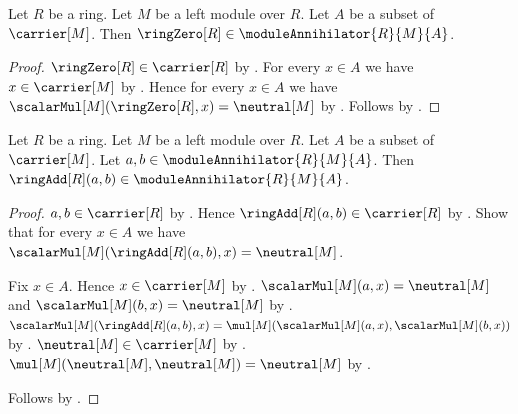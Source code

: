 \begin{proposition}\label{module_annihilator_zero}
    Let $R$ be a ring.
    Let $M$ be a left module over $R$.
    Let $A$ be a subset of $\carrier[M]$.
    Then $\ringZero[R]\in\moduleAnnihilator{R}{M}{A}$.
\end{proposition}
\begin{proof}
    $\ringZero[R]\in\carrier[R]$ by .
    For every $x\in A$ we have $x\in\carrier[M]$ by .
    Hence for every $x\in A$ we have
        $\scalarMul[M](\ringZero[R],x)=\neutral[M]$ by
        .
    Follows by .
\end{proof}

\begin{proposition}\label{module_annihilator_addition}
    Let $R$ be a ring.
    Let $M$ be a left module over $R$.
    Let $A$ be a subset of $\carrier[M]$.
    Let $a,b\in\moduleAnnihilator{R}{M}{A}$.
    Then $\ringAdd[R](a,b)\in\moduleAnnihilator{R}{M}{A}$.
\end{proposition}
\begin{proof}
    $a,b\in\carrier[R]$ by .
    Hence $\ringAdd[R](a,b)\in\carrier[R]$ by .
    Show that for every $x\in A$ we have
        $\scalarMul[M](\ringAdd[R](a,b),x)=\neutral[M]$.
    \begin{subproof}
        Fix $x\in A$.
        Hence $x\in\carrier[M]$ by .
        $\scalarMul[M](a,x)=\neutral[M]$ and
            $\scalarMul[M](b,x)=\neutral[M]$ by
            .
        $\scalarMul[M](\ringAdd[R](a,b),x)
            =\mul[M](\scalarMul[M](a,x),\scalarMul[M](b,x))$ by
            .
        $\neutral[M]\in\carrier[M]$ by .
        $\mul[M](\neutral[M],\neutral[M])=\neutral[M]$ by
            .
    \end{subproof}
    Follows by .
\end{proof}

